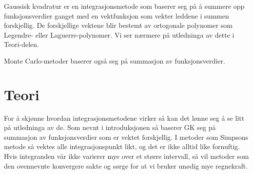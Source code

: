 \documentclass[norsk, 10pt,twocolumn]{article}
\begin{document}
Gaussisk kvadratur er en integrasjonsmetode som baserer seg på å summere opp funksjonsverdier ganget med en vektfunksjon som vekter leddene i summen forskjellig. De forskjellige vektene blir bestemt av ortogonale polynomer som Legendre- eller Laguerre-polynomer. Vi ser nærmere på utledninga av dette i Teori-delen.

Monte Carlo-metoder baserer også seg på summasjon av funksjonsverdier.

\section*{Teori}
For å skjønne hvordan integrasjonsmetodene virker så kan det lønne seg å se litt på utledninga av de. Som nevnt i introduksjonen så baserer GK seg på summasjon av funksjonsverdier som er vektet forskjellig. I metoder som Simpsons metode så vektes alle integrasjonspunkt likt, og det er ikke alltid like fornuftig. Hvis integranden vår ikke varierer mye over et større intervall, så vil metoder som den ovennevnte konvergere sakte og sørge for at vi bruker unødig mye regnekraft.
\end{document}
